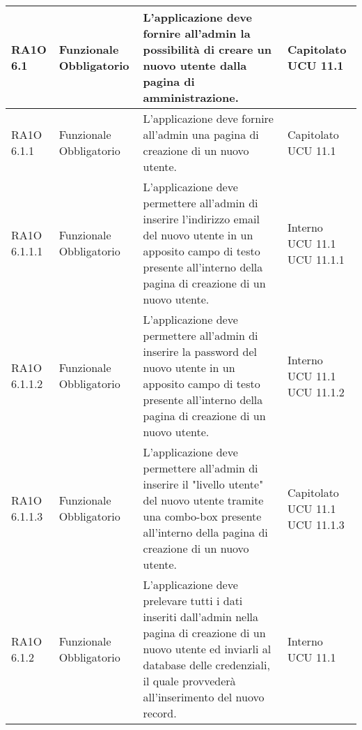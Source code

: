 \begin{center}
\begin{longtable}{ | l | p{2cm} | p{5cm} | p{1.7cm} |}
				RA1O 6.1 & Funzionale \newline  Obbligatorio  & L'applicazione deve fornire all'admin la possibilità  di creare un nuovo utente dalla pagina di amministrazione. &  Capitolato \newline  UCU 11.1 \newline  \\ \hline      
				RA1O 6.1.1 & Funzionale \newline  Obbligatorio  & L'applicazione deve fornire all'admin una pagina di creazione di un nuovo utente. &  Capitolato \newline  UCU 11.1 \newline  \\ \hline      
				RA1O 6.1.1.1 & Funzionale \newline  Obbligatorio  & L'applicazione deve permettere all'admin di inserire l'indirizzo email del nuovo utente in un apposito campo di testo presente all'interno della pagina di creazione di un nuovo utente.
 &  Interno \newline  UCU 11.1 \newline  UCU 11.1.1 \newline  \\ \hline      
				RA1O 6.1.1.2 & Funzionale \newline  Obbligatorio  & L'applicazione deve permettere all'admin di inserire la password del nuovo utente in un apposito campo di testo presente all'interno della pagina di creazione di un nuovo utente. &  Interno \newline  UCU 11.1 \newline  UCU 11.1.2 \newline  \\ \hline      
				RA1O 6.1.1.3 & Funzionale \newline  Obbligatorio  & L'applicazione deve permettere all'admin di inserire il "livello utente" del nuovo utente tramite una combo-box presente all'interno della pagina di creazione di un nuovo utente. &  Capitolato \newline  UCU 11.1 \newline  UCU 11.1.3 \newline  \\ \hline      
				RA1O 6.1.2 & Funzionale \newline  Obbligatorio  & L'applicazione deve prelevare tutti i dati inseriti dall'admin nella pagina di creazione di un nuovo utente ed inviarli al database delle credenziali, il quale provvederà  all'inserimento del nuovo record. &  Interno \newline  UCU 11.1 \newline  \\ \hline      

\end{longtable}
\end{center}
